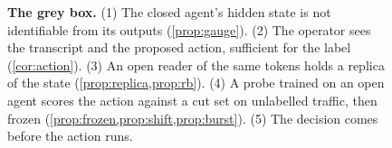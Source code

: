 \begin{figure}[t]
\centering

\caption{\textbf{The grey box.} (1) The closed agent's hidden state is not identifiable from its outputs (\cref{prop:gauge}). (2) The operator sees the transcript and the proposed action, sufficient for the label (\cref{cor:action}). (3) An open reader of the same tokens holds a replica of the state (\cref{prop:replica,prop:rb}). (4) A probe trained on an open agent scores the action against a cut set on unlabelled traffic, then frozen (\cref{prop:frozen,prop:shift,prop:burst}). (5) The decision comes before the action runs.}
\label{fig:method}
\end{figure}
